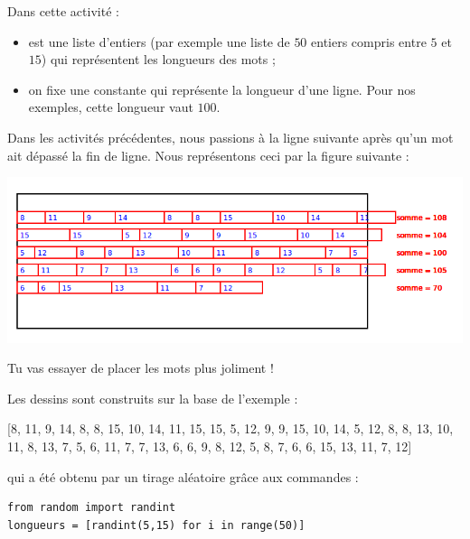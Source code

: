 \documentclass[11pt,class=report,crop=false]{standalone}
\begin{document}
\begin{activite}[Justification]



Dans cette activité :
\begin{itemize}
 \item  {} est une liste d'entiers (par exemple une liste de $50$ entiers compris entre $5$ et $15$) qui représentent les longueurs des mots ;
 \item on fixe une constante  qui représente la longueur d'une ligne. Pour nos exemples, cette longueur vaut $100$.
 \end{itemize}


Dans les activités précédentes, nous passions à la ligne suivante après qu'un mot ait dépassé la fin de ligne.
Nous représentons ceci par la figure suivante :
\begin{center}
\includegraphics[scale=0.5]{ecran-coupures-1}
\end{center} 
Tu vas essayer de placer les mots plus joliment !

Les dessins sont construits sur la base de l'exemple :
\begin{center}
 [8, 11, 9, 14, 8, 8, 15, 10, 14, 11, 15, 15, 5, 12, 9, 9, 15, 10, 14, 5, 12, 8, 8, 13, 10, 11, 8, 13, 7, 5, 6, 11, 7, 7, 13, 6, 6, 9, 8, 12, 5, 8, 7, 6, 6, 15, 13, 11, 7, 12]
\end{center}

qui a été obtenu par un tirage aléatoire grâce aux commandes :\\
\begin{lstlisting}
from random import randint
longueurs = [randint(5,15) for i in range(50)]
\end{lstlisting}



\end{activite}
\end{document}
